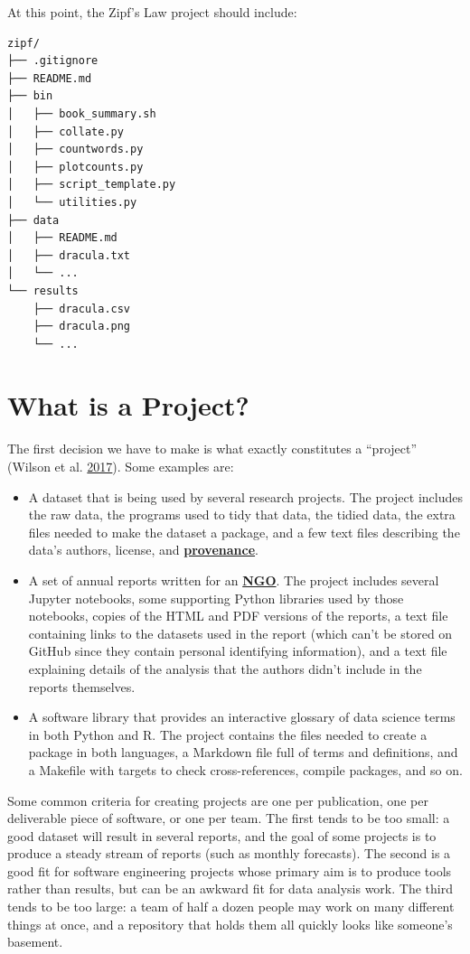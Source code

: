 \documentclass[
]{krantz}
\newcommand{\gref}[2]{\hyperlink{#2}{\textbf{#1}}}
\begin{document}
At this point,
the Zipf's Law project should include:

\begin{verbatim}
zipf/
├── .gitignore
├── README.md
├── bin
│   ├── book_summary.sh
│   ├── collate.py
│   ├── countwords.py
│   ├── plotcounts.py
│   ├── script_template.py
│   └── utilities.py
├── data
│   ├── README.md
│   ├── dracula.txt
│   └── ...
└── results
    ├── dracula.csv
    ├── dracula.png
    └── ...
\end{verbatim}

\hypertarget{teams-scope}{%
\section{What is a Project?}\label{teams-scope}}

The first decision we have to make is what exactly constitutes a ``project'' (Wilson et al. \protect\hyperlink{ref-Wils2017}{2017}).
Some examples are:

\begin{itemize}
\item
  A dataset that is being used by several research projects.
  The project includes the raw data,
  the programs used to tidy that data,
  the tidied data,
  the extra files needed to make the dataset a package,
  and a few text files describing the data's authors, license, and \gref{provenance}{provenance}.
\item
  A set of annual reports written for an \gref{NGO}{ngo}.
  The project includes several Jupyter notebooks,
  some supporting Python libraries used by those notebooks,
  copies of the HTML and PDF versions of the reports,
  a text file containing links to the datasets used in the report
  (which can't be stored on GitHub since they contain personal identifying information),
  and a text file explaining details of the analysis that the authors didn't include in the reports themselves.
\item
  A software library that provides an interactive glossary of data science terms in both Python and R.
  The project contains the files needed to create a package in both languages,
  a Markdown file full of terms and definitions,
  and a Makefile with targets to check cross-references, compile packages, and so on.
\end{itemize}

Some common criteria for creating projects are one per publication,
one per deliverable piece of software,
or one per team.
The first tends to be too small:
a good dataset will result in several reports,
and the goal of some projects is to produce a steady stream of reports (such as monthly forecasts).
The second is a good fit for software engineering projects
whose primary aim is to produce tools rather than results,
but can be an awkward fit for data analysis work.
The third tends to be too large:
a team of half a dozen people may work on many different things at once,
and a repository that holds them all quickly looks like someone's basement.
\end{document}
